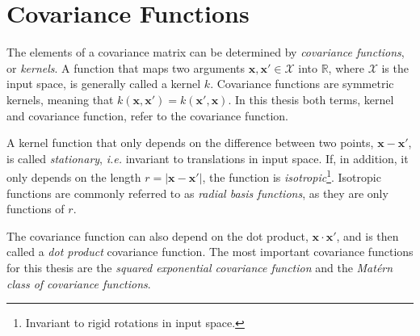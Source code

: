 \documentclass[twoside,english]{uiofysmaster}
\begin{document}
{{\section{Covariance Functions}\label{Sec:: gaussian processes : Covariance functions}


The elements of a covariance matrix can be determined by \textit{covariance functions}, or \textit{kernels}. A function that maps two arguments $\textbf{x},\textbf{x}' \in \mathcal{X}$ into $\mathbb{R}$, where $\mathcal{X}$ is the input space, is generally called a kernel $k$. Covariance functions are symmetric kernels, meaning that $k(\textbf{x}, \textbf{x}') = k(\textbf{x}', \textbf{x})$. In this thesis both terms, kernel and covariance function, refer to the covariance function. 


A kernel function that only depends on the difference between two points, $\textbf{x}-\textbf{x}'$, is called \textit{stationary}, \textit{i.e.} invariant to translations in input space. If, in addition, it only depends on the length $r=|\textbf{x}-\textbf{x}'|$, the function is \textit{isotropic}\footnote{Invariant to rigid rotations in input space.}.  Isotropic functions are commonly referred to as \textit{radial basis functions}, as they are only functions of $r$. 

The covariance function can also depend on the dot product, $\textbf{x} \cdot \textbf{x}'$, and is then called a \textit{dot product} covariance function. The most important covariance functions for this thesis are the \textit{squared exponential covariance function} and the \textit{Mat\'{e}rn class of covariance functions}.




}}
\end{document}
